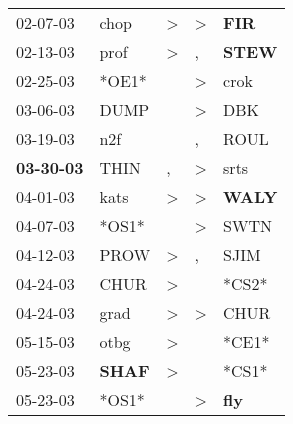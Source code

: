\begin{supertabular}{p{0.07\textwidth}p{0.06\textwidth}p{0.02\textwidth}p{0.02\textwidth}p{0.06\textwidth}}
          02-07-03\textsuperscript{} &           chop\textsuperscript{} &     \textgreater &     \textgreater &   \textbf{FIR\textsuperscript{}} \\
          02-13-03\textsuperscript{} &           prof\textsuperscript{} &     \textgreater &                , &  \textbf{STEW\textsuperscript{}} \\
          02-25-03\textsuperscript{} &                            *OE1* &                  &     \textgreater &           crok\textsuperscript{} \\
          03-06-03\textsuperscript{} &           DUMP\textsuperscript{} &                  &     \textgreater &            DBK\textsuperscript{} \\
          03-19-03\textsuperscript{} &            n2f\textsuperscript{} &                  &                , &           ROUL\textsuperscript{} \\
 \textbf{03-30-03\textsuperscript{}} &           THIN\textsuperscript{} &                , &     \textgreater &           srts\textsuperscript{} \\
          04-01-03\textsuperscript{} &           kats\textsuperscript{} &     \textgreater &     \textgreater &  \textbf{WALY\textsuperscript{}} \\
          04-07-03\textsuperscript{} &                            *OS1* &                  &     \textgreater &           SWTN\textsuperscript{} \\
          04-12-03\textsuperscript{} &           PROW\textsuperscript{} &     \textgreater &                , &           SJIM\textsuperscript{} \\
          04-24-03\textsuperscript{} &           CHUR\textsuperscript{} &     \textgreater &                  &                            *CS2* \\
          04-24-03\textsuperscript{} &           grad\textsuperscript{} &     \textgreater &     \textgreater &           CHUR\textsuperscript{} \\
          05-15-03\textsuperscript{} &           otbg\textsuperscript{} &     \textgreater &                  &                            *CE1* \\
          05-23-03\textsuperscript{} &  \textbf{SHAF\textsuperscript{}} &     \textgreater &                  &                            *CS1* \\
          05-23-03\textsuperscript{} &                            *OS1* &                  &     \textgreater &   \textbf{fly\textsuperscript{}} \\

\end{supertabular}
